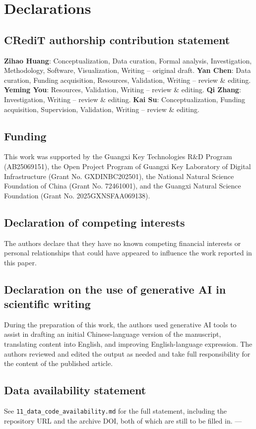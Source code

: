 \documentclass[preprint,12pt,authoryear]{elsarticle}
\begin{document}
\section*{Declarations}
\subsection*{CRediT authorship contribution statement}
\textbf{Zihao Huang}: Conceptualization, Data curation, Formal analysis,
Investigation, Methodology, Software, Visualization, Writing -- original draft.
\textbf{Yan Chen}: Data curation, Funding acquisition, Resources, Validation,
Writing -- review \& editing. \textbf{Yeming You}: Resources, Validation,
Writing -- review \& editing. \textbf{Qi Zhang}: Investigation,
Writing -- review \& editing. \textbf{Kai Su}: Conceptualization, Funding
acquisition, Supervision, Validation, Writing -- review \& editing.
\subsection*{Funding}
This work was supported by the Guangxi Key Technologies R\&D Program
(AB25069151), the Open Project Program of Guangxi Key Laboratory of Digital
Infrastructure (Grant No. GXDINBC202501), the National Natural Science
Foundation of China (Grant No. 72461001), and the Guangxi Natural Science
Foundation (Grant No. 2025GXNSFAA069138).
\subsection*{Declaration of competing interests}
The authors declare that they have no known competing financial interests or
personal relationships that could have appeared to influence the work reported
in this paper.
\subsection*{Declaration on the use of generative AI in scientific writing}
During the preparation of this work, the authors used generative AI tools to
assist in drafting an initial Chinese-language version of the manuscript,
translating content into English, and improving English-language expression.
The authors reviewed and edited the output as needed and take full
responsibility for the content of the published article.
\subsection*{Data availability statement}
See \texttt{11\_data\_code\_availability.\allowbreak{}md} for the full statement, including the
repository URL and the archive DOI, both of which are still to be filled in.
---
\end{document}
